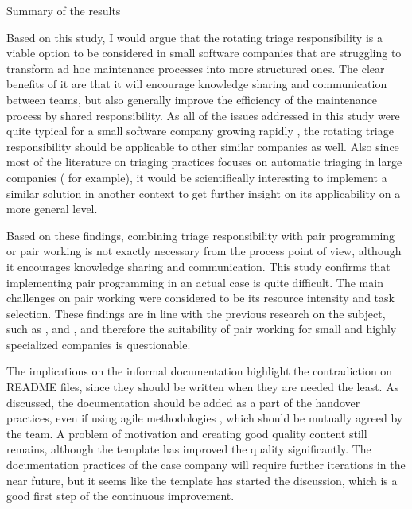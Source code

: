 \begin{table}
\begin{center}
		\caption{Summary of the results}
		\label{table:goal-results}
	\end{center}
\end{table}

Based on this study, I would argue that the rotating triage responsibility is a viable option to be considered in small software companies that are struggling to transform ad hoc maintenance processes
into more structured ones. The clear benefits of it are that it will encourage knowledge sharing and communication between teams, but also generally improve the efficiency of the maintenance process by shared
responsibility. As all of the issues addressed in this study were quite typical for a small software company growing rapidly \citep{Hasan2011}, the rotating triage responsibility should be applicable to
other similar companies as well. Also since most of the literature on triaging practices focuses on automatic triaging in large companies (\citet{Hu2014} for example),
it would be scientifically interesting to implement
a similar solution in another context to get further insight on its applicability on a more general level.

Based on these findings, combining triage responsibility with pair programming or pair working is not exactly necessary from the process point of view,
although it encourages knowledge sharing and communication. This study confirms that implementing
pair programming in an actual case is quite difficult. The main challenges on pair working were considered to be its resource intensity
and task selection. These findings are in line with the previous research on the subject, such as \citet{Lui2010}, \citet{Plonka2012} and \citet{Spohrer2013},
and therefore the suitability of pair working for small and highly specialized companies is questionable.

The implications on the informal documentation highlight the contradiction on README files, since they should be written when they are needed the least. As discussed, the documentation should be added
as a part of the handover practices, even if using agile methodologies \citep{Stettina2013}, which should be mutually agreed by the team. A problem of motivation and creating good quality
content still remains, although the template has improved
the quality significantly. The documentation practices of the case company will require further iterations in the near future, but it seems like the template has started the discussion, which is a good first step
of the continuous improvement.

